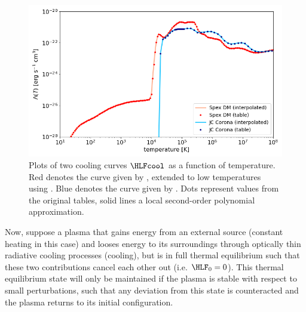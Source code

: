 \begin{figure}[t]
  \centering
  \includegraphics[width=\textwidth]{coolingcurves.png}
  \caption{
    Plots of two cooling curves $\HLFcool$ as a function of temperature. Red denotes the curve given by \citet{schure2009}, extended to low temperatures using \citet{dalgarno1972}. Blue denotes the curve given by \citet{colgan2008}. Dots represent values from the original tables, solid lines a local second-order polynomial approximation.
  }
  \label{fig: coolingcurves}
\end{figure}

Now, suppose a plasma that gains energy from an external source (constant heating in this case) and looses energy to its surroundings through optically thin radiative cooling processes (cooling), but is in full thermal equilibrium such that these two contributions cancel each other out (i.e. $\HLF_0 = 0$). This thermal equilibrium state will only be maintained if the plasma is stable with respect to small perturbations, such that any deviation from this state is counteracted and the plasma returns to its initial configuration.

